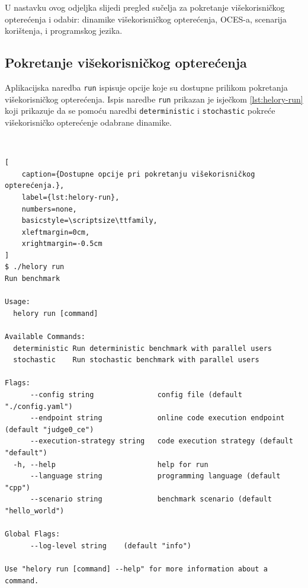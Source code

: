 \documentclass[times, utf8, diplomski]{fer}
\begin{document}
U nastavku ovog odjeljka slijedi pregled sučelja za pokretanje višekorisničkog opterećenja i odabir: dinamike višekorisničkog opterećenja, OCES-a, scenarija korištenja, i programskog jezika.

\pagebreak

\subsection{Pokretanje višekorisničkog opterećenja}
Aplikacijska naredba \lstinline{run} ispisuje opcije  koje su dostupne prilikom pokretanja višekorisničkog opterećenja. Ispis naredbe \lstinline{run} prikazan je isječkom \ref{lst:helory-run} koji prikazuje da se pomoću naredbi \lstinline{deterministic} i \lstinline{stochastic} pokreće višekorisničko opterećenje odabrane dinamike.

\

\begin{lstlisting}[
    caption={Dostupne opcije pri pokretanju višekorisničkog opterećenja.},
    label={lst:helory-run},
    numbers=none,
    basicstyle=\scriptsize\ttfamily,
    xleftmargin=0cm,
    xrightmargin=-0.5cm
]
$ ./helory run
Run benchmark

Usage:
  helory run [command]

Available Commands:
  deterministic Run deterministic benchmark with parallel users
  stochastic    Run stochastic benchmark with parallel users

Flags:
      --config string               config file (default "./config.yaml")
      --endpoint string             online code execution endpoint (default "judge0_ce")
      --execution-strategy string   code execution strategy (default "default")
  -h, --help                        help for run
      --language string             programming language (default "cpp")
      --scenario string             benchmark scenario (default "hello_world")

Global Flags:
      --log-level string    (default "info")

Use "helory run [command] --help" for more information about a command.
\end{lstlisting}
\end{document}
